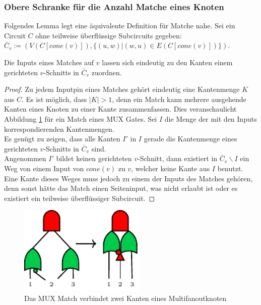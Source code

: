 \documentclass[11pt, a4paper, german]{article}
\begin{document}
\subsubsection{Obere Schranke für die Anzahl Matche eines Knoten}
\label{subsubsec:anzahl_matchings}
Folgendes Lemma legt eine äquivalente Definition für Matche nahe.
Sei ein Circuit $C$ ohne teilweise überflüssige Subcircuits gegeben: \\$\bar{C}_v := (V(C[cone(v)]), \{ (u,w) | (w,u) \in E(C[cone(v)])\})$.
\begin{lemma}{Die Inputs eines Matches auf $v$ lassen sich eindeutig zu den Kanten einem gerichteten $v$-Schnitts in $\bar{C}_v $} zuordnen.
\end{lemma}
\begin{proof}
Zu jedem Inputpin eines Matches gehört eindeutig eine Kantenmenge $K$ aus $C$. Es ist möglich, dass $|K| > 1$, denn ein Match kann mehrere ausgehende Kanten eines Knoten zu einer Kante zusammenfassen. Dies veranschaulicht Abbildung \ref{bild:mux_match} für ein Match eines MUX Gates.  Sei $I$ die Menge der mit den Inputs korrespondierenden Kantenmengen.\\
Es genügt zu zeigen, dass alle Kanten $I'$ in $I$ gerade die Kantenmenge eines gerichteten $v$-Schnitts in $\bar{C}_v$ sind. \\
Angenommen $I'$ bildet keinen gerichteten $v$-Schnitt, dann existiert in $\bar{C}_v\backslash I$ ein Weg von einem Input von $cone(v)$ zu $v$, welcher keine Kante aus $I$ benutzt. \\
Eine Kante dieses Weges muss jedoch zu einem der Inputs des Matches gehören, denn sonst hätte das Match einen Seiteninput, was nicht erlaubt ist oder es existiert ein teilweise überflüssiger Subcircuit. 
\end{proof}

\begin{figure}
		\includegraphics[width = 6cm]{pictures/compiled/mux_match}
		\caption{Das MUX Match verbindet zwei Kanten eines Multifanoutknoten}
		\label{bild:mux_match}
\end{figure}
\end{document}
